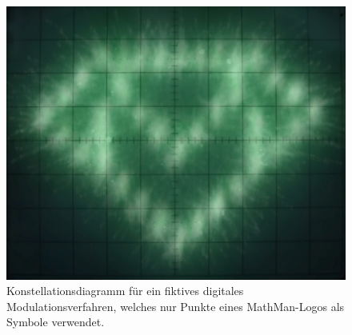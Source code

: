 \begin{figure}
\centering
\includegraphics[width=0.7\hsize]{applications/qam/images/digital.jpg}
\caption{Konstellationsdiagramm für ein fiktives digitales
Modulationsverfahren, welches nur Punkte eines MathMan-Logos als
Symbole verwendet.
\label{qam:figure:digital}}
\end{figure}


